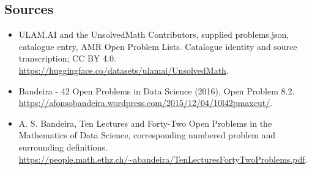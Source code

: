\documentclass[11pt,a4paper]{article}
\begin{document}
\subsection{Sources}
\begin{itemize}
\item[S1] ULAM.AI and the UnsolvedMath Contributors, supplied problems.json, catalogue entry, AMR Open Problem Lists. Catalogue identity and source transcription; CC BY 4.0.
\url{https://huggingface.co/datasets/ulamai/UnsolvedMath}.
\item[S2] Bandeira - 42 Open Problems in Data Science (2016), Open Problem 8.2. 
\url{https://afonsobandeira.wordpress.com/2015/12/04/10l42pmaxcut/}.
\item[S3] A. S. Bandeira, Ten Lectures and Forty-Two Open Problems in the Mathematics of Data Science, corresponding numbered problem and surrounding definitions.
\url{https://people.math.ethz.ch/~abandeira/TenLecturesFortyTwoProblems.pdf}.
\end{itemize}
\end{document}
